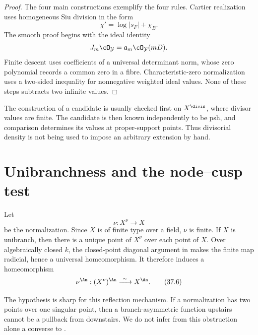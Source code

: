 \begin{proof}
The four main constructions exemplify the four rules.  Cartier realization
uses homogeneous Siu division in the form
\[
                     \chi'=\log|s_F|+\chi_B.
\]
The smooth proof begins with the ideal identity
\[
 J_m\cO_{\mathcal Y}
     =\mathfrak a_m\cO_{\mathcal Y}(mD).
\]
Finite descent uses coefficients of a universal determinant norm, whose
zero polynomial records a common zero in a fibre.  Characteristic-zero
normalization uses a two-sided inequality for nonnegative weighted ideal
values.  None of these steps subtracts two infinite values.
\end{proof}

\begin{remark}
\label{rem:ch37-divisorial-computation}
The construction of a candidate is usually checked first on
$X^{\divis}$, where divisor values are finite.  The candidate is then
known independently to be psh, and comparison determines its values at
proper-support points.  Thus divisorial density is not being used to impose
an arbitrary extension by hand.
\end{remark}

\section{Unibranchness and the node--cusp test}
\label{sec:ch37-node-cusp}

Let
\[
                         \nu:X^\nu\longrightarrow X
\tag{37.5}\label{eq:bj-normalization-preview}
\]
be the normalization.  Since $X$ is of finite type over a field, $\nu$
is finite.  If $X$ is unibranch, then there is a unique point of
$X^\nu$ over each point of $X$.  Over algebraically closed $k$, the
closed-point diagonal argument in
 makes the finite map
radicial, hence a universal homeomorphism.  It
therefore induces a homeomorphism
\[
             \nu^{\An}:(X^\nu)^{\An}\xrightarrow{\ \sim\ }X^{\An}.
\tag{37.6}\label{eq:bj-normalization-analytic-homeomorphism}
\]

The hypothesis is sharp for this reflection mechanism.  If a normalization
has two points over one singular point, then a branch-asymmetric function
upstairs cannot be a pullback from downstairs.  We do not infer from this
obstruction alone a converse to .

